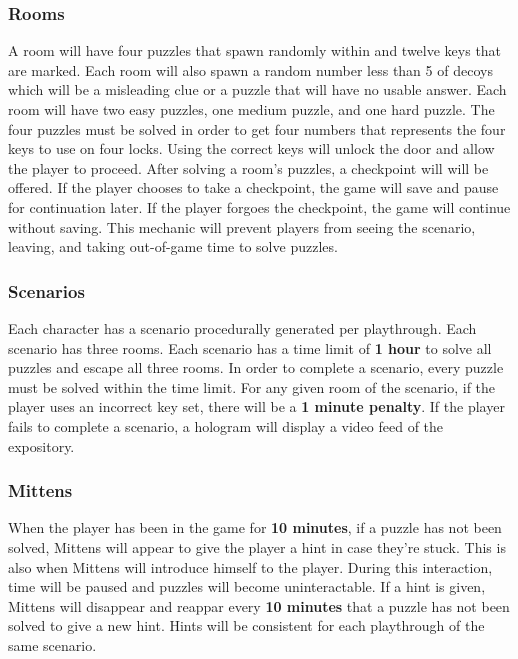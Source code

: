 \documentclass[11pt]{article}
\begin{document}
\subsubsection{Rooms}
\label{sec:orgac432f0}
A room will have four puzzles that spawn randomly within and twelve keys that are marked. Each room will also spawn a random number less than 5 of decoys which will be a misleading clue or a puzzle that will have no usable answer. Each room will have two easy puzzles, one medium puzzle, and one hard puzzle. The four puzzles must be solved in order to get four numbers that represents the four keys to use on four locks. Using the correct keys will unlock the door and allow the player to proceed. After solving a room's puzzles, a checkpoint will will be offered. If the player chooses to take a checkpoint, the game will save and pause for continuation later. If the player forgoes the checkpoint, the game will continue without saving. This mechanic will prevent players from seeing the scenario, leaving, and taking out-of-game time to solve puzzles.

\subsubsection{Scenarios}
\label{sec:org9ca4bfa}
Each character has a scenario procedurally generated per playthrough. Each scenario has three rooms. Each scenario has a time limit of \textbf{1 hour} to solve all puzzles and escape all three rooms. In order to complete a scenario, every puzzle must be solved within the time limit. For any given room of the scenario, if the player uses an incorrect key set, there will be a \textbf{1 minute penalty}. If the player fails to complete a scenario, a hologram will display a video feed of the expository. 

\subsubsection{Mittens}
\label{sec:orgdf663c4}
When the player has been in the game for \textbf{10 minutes}, if a puzzle has not been solved, Mittens will appear to give the player a hint in case they're stuck. This is also when Mittens will introduce himself to the player. During this interaction, time will be paused and puzzles will become uninteractable. If a hint is given, Mittens will disappear and reappar every \textbf{10 minutes} that a puzzle has not been solved to give a new hint. Hints will be consistent for each playthrough of the same scenario.
\end{document}
